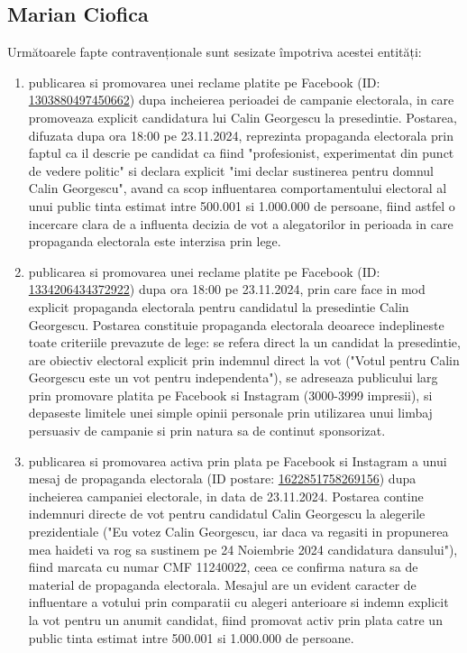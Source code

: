\documentclass[a4paper,12pt]{article}
\begin{document}
\vspace{0.5cm}

\subsection{Marian Ciofica}
Următoarele fapte contravenționale sunt sesizate împotriva acestei entități:

\begin{enumerate}[leftmargin=*, label=\arabic*.)]
    \item publicarea si promovarea unei reclame platite pe Facebook (ID: \href{https://www.facebook.com/ads/library/?id=1303880497450662}{1303880497450662}) dupa incheierea perioadei de campanie electorala, in care promoveaza explicit candidatura lui Calin Georgescu la presedintie. Postarea, difuzata dupa ora 18:00 pe 23.11.2024, reprezinta propaganda electorala prin faptul ca il descrie pe candidat ca fiind "profesionist, experimentat din punct de vedere politic" si declara explicit "imi declar sustinerea pentru domnul Calin Georgescu", avand ca scop influentarea comportamentului electoral al unui public tinta estimat intre 500.001 si 1.000.000 de persoane, fiind astfel o incercare clara de a influenta decizia de vot a alegatorilor in perioada in care propaganda electorala este interzisa prin lege.
    \item publicarea si promovarea unei reclame platite pe Facebook (ID: \href{https://www.facebook.com/ads/library/?id=1334206434372922}{1334206434372922}) dupa ora 18:00 pe 23.11.2024, prin care face in mod explicit propaganda electorala pentru candidatul la presedintie Calin Georgescu. Postarea constituie propaganda electorala deoarece indeplineste toate criteriile prevazute de lege: se refera direct la un candidat la presedintie, are obiectiv electoral explicit prin indemnul direct la vot ("Votul pentru Calin Georgescu este un vot pentru independenta"), se adreseaza publicului larg prin promovare platita pe Facebook si Instagram (3000-3999 impresii), si depaseste limitele unei simple opinii personale prin utilizarea unui limbaj persuasiv de campanie si prin natura sa de continut sponsorizat.
    \item publicarea si promovarea activa prin plata pe Facebook si Instagram a unui mesaj de propaganda electorala (ID postare: \href{https://www.facebook.com/ads/library/?id=1622851758269156}{1622851758269156}) dupa incheierea campaniei electorale, in data de 23.11.2024. Postarea contine indemnuri directe de vot pentru candidatul Calin Georgescu la alegerile prezidentiale ("Eu votez Calin Georgescu, iar daca va regasiti in propunerea mea haideti va rog sa sustinem pe 24 Noiembrie 2024 candidatura dansului"), fiind marcata cu numar CMF 11240022, ceea ce confirma natura sa de material de propaganda electorala. Mesajul are un evident caracter de influentare a votului prin comparatii cu alegeri anterioare si indemn explicit la vot pentru un anumit candidat, fiind promovat activ prin plata catre un public tinta estimat intre 500.001 si 1.000.000 de persoane.

\end{enumerate}
\end{document}
